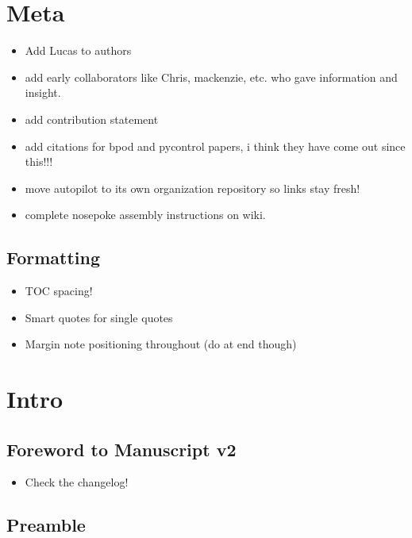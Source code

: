 \section{Meta}

\begin{itemize}
\item Add Lucas to authors
\item add early collaborators like Chris, mackenzie, etc. who gave information and insight.
\item add contribution statement
\item add citations for bpod and pycontrol papers, i think they have come out since this!!!
\item move autopilot to its own organization repository so links stay fresh!
\item complete nosepoke assembly instructions on wiki.
\end{itemize}

\subsection{Formatting}

\begin{itemize}
\item TOC spacing!
\item Smart quotes for single quotes
\item Margin note positioning throughout (do at end though)
\end{itemize}

\section{Intro}

\subsection{Foreword to Manuscript v2}

\begin{itemize}
\item Check the changelog!
\end{itemize}

\subsection{Preamble}

